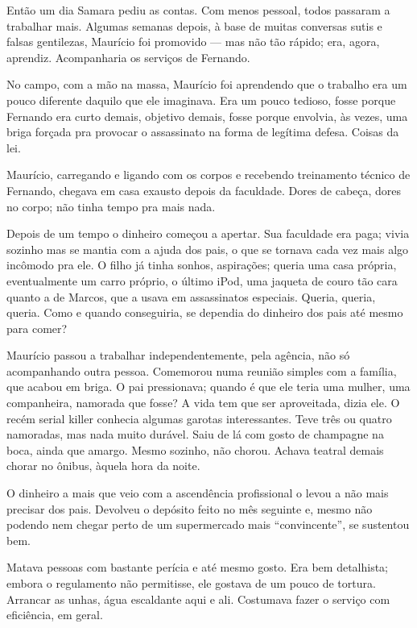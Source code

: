 \begin{sloppypar}
Então um dia Samara pediu as contas. Com menos pessoal, todos passaram a trabalhar mais. Algumas semanas depois, à base de muitas conversas sutis e falsas gentilezas, Maurício foi promovido --- mas não tão rápido; era, agora, aprendiz. Acompanharia os serviços de Fernando.
\end{sloppypar}

No campo, com a mão na massa, Maurício foi aprendendo que o trabalho era um pouco diferente daquilo que ele imaginava. Era um pouco tedioso, fosse porque Fernando era curto demais, objetivo demais, fosse porque envolvia, às vezes, uma briga forçada pra provocar o assassinato na forma de legítima defesa. Coisas da lei.

Maurício, carregando e ligando com os corpos e recebendo treinamento técnico de Fernando, chegava em casa exausto depois da faculdade. Dores de cabeça, dores no corpo; não tinha tempo pra mais nada.

Depois de um tempo o dinheiro começou a apertar. Sua faculdade era paga; vivia sozinho mas se mantia com a ajuda dos pais, o que se tornava cada vez mais algo incômodo pra ele. O filho já tinha sonhos, aspirações; queria uma casa pró\-pri\-a, eventualmente um carro próprio, o último iPod, uma jaqueta de couro tão cara quanto a de Marcos, que a usava em assassinatos especiais. Queria, queria, queria. Como e quando conseguiria, se dependia do dinheiro dos pais até mesmo para comer?

\begin{sloppypar}
Maurício passou a trabalhar independentemente, pela agência, não só acompanhando outra pessoa. Comemorou numa reunião simples com a família, que acabou em briga. O pai pressionava; quando é que ele teria uma mulher, uma companheira, namorada que fosse? A vida tem que ser aproveitada, dizia ele. O recém \foreignlanguage{english}{serial killer} conhecia algumas garotas interessantes. Teve três ou quatro namoradas, mas nada muito durável. Saiu de lá com gosto de champagne na boca, ainda que amargo. Mesmo sozinho, não chorou. Achava teatral demais chorar no ônibus, àquela hora da noite.
\end{sloppypar}

O dinheiro a mais que veio com a ascendência profissional o levou a não mais precisar dos pais. Devolveu o depósito feito no mês seguinte e, mesmo não podendo nem chegar perto de um supermercado mais ``convincente'', se sustentou bem.

Matava pessoas com bastante perícia e até mesmo gosto. Era bem detalhista; embora o regulamento não permitisse, ele gostava de um pouco de tortura. Arrancar as unhas, água escaldante aqui e ali. Costumava fazer o serviço com eficiência, em geral.

